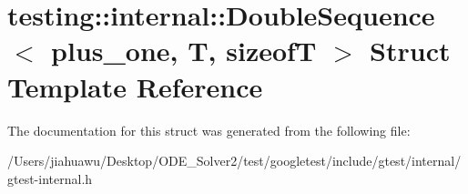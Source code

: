\hypertarget{structtesting_1_1internal_1_1_double_sequence}{}\section{testing\+:\+:internal\+:\+:Double\+Sequence$<$ plus\+\_\+one, T, sizeofT $>$ Struct Template Reference}
\label{structtesting_1_1internal_1_1_double_sequence}


The documentation for this struct was generated from the following file\+:\begin{DoxyCompactItemize}
\item 
/\+Users/jiahuawu/\+Desktop/\+O\+D\+E\+\_\+\+Solver2/test/googletest/include/gtest/internal/gtest-\/internal.\+h\end{DoxyCompactItemize}
